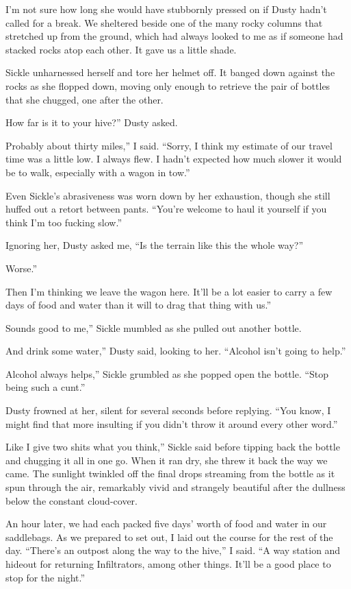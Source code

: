 I’m not sure how long she would have stubbornly pressed on if Dusty hadn’t called for a break. We sheltered beside one of the many rocky columns that stretched up from the ground, which had always looked to me as if someone had stacked rocks atop each other. It gave us a little shade.

Sickle unharnessed herself and tore her helmet off. It banged down against the rocks as she flopped down, moving only enough to retrieve the pair of bottles that she chugged, one after the other.

\leavevmode{}How far is it to your hive?” Dusty asked.

\leavevmode{}Probably about thirty miles,” I said. “Sorry, I think my estimate of our travel time was a little low. I always flew. I hadn’t expected how much slower it would be to walk, especially with a wagon in tow.”

Even Sickle’s abrasiveness was worn down by her exhaustion, though she still huffed out a retort between pants. “You’re welcome to haul it yourself if you think I’m too fucking slow.”

Ignoring her, Dusty asked me, “Is the terrain like this the whole way?”

\leavevmode{}Worse.”

\leavevmode{}Then I’m thinking we leave the wagon here. It’ll be a lot easier to carry a few days of food and water than it will to drag that thing with us.”

\leavevmode{}Sounds good to me,” Sickle mumbled as she pulled out another bottle.

\leavevmode{}And drink some water,” Dusty said, looking to her. “Alcohol isn’t going to help.”

\leavevmode{}Alcohol always helps,” Sickle grumbled as she popped open the bottle. “Stop being such a cunt.”

Dusty frowned at her, silent for several seconds before replying. “You know, I might find that more insulting if you didn’t throw it around every other word.”

\leavevmode{}Like I give two shits what you think,” Sickle said before tipping back the bottle and chugging it all in one go. When it ran dry, she threw it back the way we came. The sunlight twinkled off the final drops streaming from the bottle as it spun through the air, remarkably vivid and strangely beautiful after the dullness below the constant cloud-cover.

An hour later, we had each packed five days’ worth of food and water in our saddlebags. As we prepared to set out, I laid out the course for the rest of the day. “There’s an outpost along the way to the hive,” I said. “A way station and hideout for returning Infiltrators, among other things. It’ll be a good place to stop for the night.”

